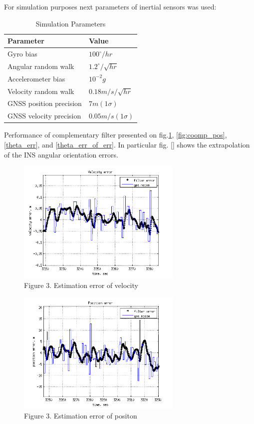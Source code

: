 \documentclass[conference, utf8]{IEEEtran}
\begin{document}
For simulation purposes next parameters of inertial sensors was used:
\begin{table}[!t]\footnotesize
\centering
\renewcommand{\arraystretch}{1.3}
  \caption{Simulation Parameters}
    \begin{tabular}{|l|p{50mm}|} \hline 
      Parameter & Value \\ \hline  \hline 
      Gyro bias & $100^{\circ } /hr$ \\ \hline 
      Angular random walk & $1.2^{\circ } /\sqrt{hr} $ \\ \hline 
      Accelerometer bias & $10^{-2} g$ \\ \hline 
      Velocity random walk & $0.18m/s/\sqrt{hr} $ \\ \hline 
      GNSS position precision & $7m(1\sigma )$ \\ \hline 
      GNSS velocity precision & $0.05m/s(1\sigma )$ \\ \hline 
    \end{tabular}
  \label{tab:sim}
 \end{table}


Performance of complementary filter presented on fig.\ref{fig:coomp_v}, \ref{fig:coomp_pos}, \ref{theta_err}, and \ref{theta_err_of_err}. In particular fig. \ref{} shows the extrapolation 
of the INS angular orientation errors. 

\begin{figure}[!t]
  \centering
  \includegraphics[width=3.1in]{vn_err_of_err}
  \caption{Figure 3.  Estimation error of velocity}
  \label{fig:coomp_v}
\end{figure}

\begin{figure}[!t]
  \centering
  \includegraphics[width=3.1in]{phi_err_of_err}
  \caption{Figure 3.  Estimation error of positon}
  \label{fig:comp_pos}
\end{figure}
\end{document}
